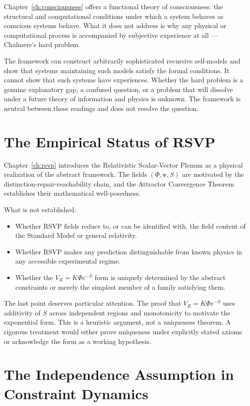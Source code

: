 \documentclass[12pt,twoside,openright]{book}
\begin{document}
Chapter~\ref{ch:consciousness} offers a functional theory of
consciousness: the structural and computational conditions
under which a system behaves as conscious systems behave.
What it does not address is why any physical or
computational process is accompanied by subjective
experience at all --- Chalmers's hard problem.

The framework can construct arbitrarily sophisticated
recursive self-models and show that systems maintaining
such models satisfy the formal conditions. It cannot show
that such systems have experiences. Whether the hard problem
is a genuine explanatory gap, a confused question, or a
problem that will dissolve under a future theory of
information and physics is unknown. The framework is
neutral between these readings and does not resolve the
question.

\section{The Empirical Status of RSVP}

Chapter~\ref{ch:rsvp} introduces the Relativistic
Scalar-Vector Plenum as a physical realization of the
abstract framework. The fields $(\Phi, \mathbf{v}, S)$ are
motivated by the distinction-repair-reachability chain, and
the Attractor Convergence Theorem establishes their
mathematical well-posedness.

What is not established:
\begin{itemize}[nosep]
  \item Whether RSVP fields reduce to, or can be identified
        with, the field content of the Standard Model or
        general relativity.
  \item Whether RSVP makes any prediction distinguishable
        from known physics in any accessible experimental
        regime.
  \item Whether the $V_R = K\Phi e^{-S}$ form is uniquely
        determined by the abstract constraints or merely the
        simplest member of a family satisfying them.
\end{itemize}
The last point deserves particular attention. The proof that
$V_R = K\Phi e^{-S}$ uses additivity of $S$ across
independent regions and monotonicity to motivate the
exponential form. This is a heuristic argument, not a
uniqueness theorem. A rigorous treatment would either prove
uniqueness under explicitly stated axioms or acknowledge
the form as a working hypothesis.

\section{The Independence Assumption in Constraint Dynamics}
\end{document}

